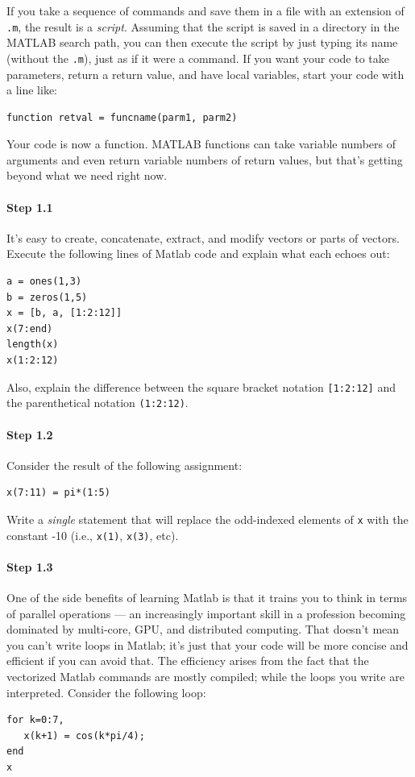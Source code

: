 If you take a sequence of commands and save them in a file with an
extension of \texttt{.m}, the result is a \emph{script}. Assuming that the
script is saved in a directory in the MATLAB search path, you can then
execute the script by just typing its name (without the \texttt{.m}),
just as if it were a command. If you want your code to take
parameters, return a return value, and have local variables, start
your code with a line like:
\begin{lstlisting}[style=Matlab-editor,basicstyle=\mlttfamily\small]
function retval = funcname(parm1, parm2)
\end{lstlisting}

Your code is now a function. MATLAB functions can take variable
numbers of arguments and even return variable numbers of return
values, but that's getting beyond what we need right now.

\paragraph{Step 1.1} It's easy to create, concatenate, extract, and modify
vectors or parts of vectors. Execute the following lines of Matlab
code and explain what each echoes out: 
\begin{lstlisting}[style=Matlab-editor,basicstyle=\mlttfamily\small]
a = ones(1,3)
b = zeros(1,5)
x = [b, a, [1:2:12]]
x(7:end)
length(x)
x(1:2:12)
\end{lstlisting}

Also, explain the difference between the square bracket notation
\verb|[1:2:12]| and the parenthetical notation \verb|(1:2:12)|.

\paragraph{Step 1.2} Consider the result of the following assignment:
\begin{lstlisting}[style=Matlab-editor,basicstyle=\mlttfamily\small]
x(7:11) = pi*(1:5)
\end{lstlisting}

Write a \emph{single} statement that will replace the odd-indexed
elements of \texttt{x} with the constant -10 (i.e., \texttt{x(1)},
\texttt{x(3)}, etc).


\paragraph{Step 1.3} One of the side benefits of learning Matlab is
that it trains you to think in terms of parallel operations --- an
increasingly important skill in a profession becoming dominated by
multi-core, GPU, and distributed computing. That doesn't mean you
can't write loops in Matlab; it's just that your code will be more
concise and efficient if you can avoid that. The efficiency arises
from the fact that the vectorized Matlab commands are mostly compiled;
while the loops you write are interpreted. Consider the following loop:
\begin{lstlisting}[style=Matlab-editor,basicstyle=\mlttfamily\small]
for k=0:7,
   x(k+1) = cos(k*pi/4);
end
x
\end{lstlisting}

